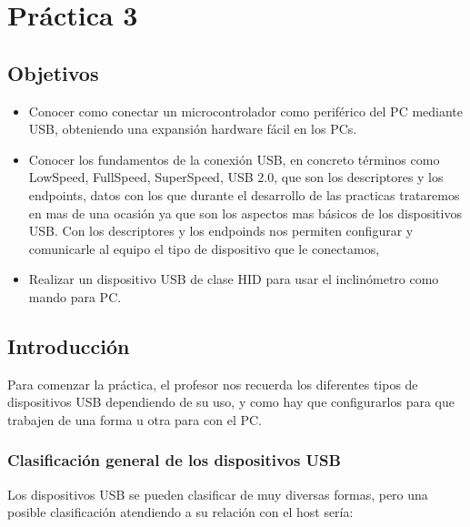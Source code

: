 \documentclass[a4paper, 11pt]{article}
\begin{document}
\section{Práctica 3}

\subsection{Objetivos}

\begin{itemize}
    \item Conocer como conectar un microcontrolador como periférico del PC
        mediante USB, obteniendo una expansión hardware fácil en los PCs.

    \item Conocer los fundamentos de la conexión USB, en concreto términos como
        LowSpeed, FullSpeed, SuperSpeed, USB 2.0, que son los descriptores y
        los endpoints, datos con los que durante el desarrollo de las practicas
        trataremos en mas de una ocasión ya que son los aspectos mas básicos de
        los dispositivos USB.  Con los descriptores y los endpoinds nos
        permiten configurar y comunicarle al equipo el tipo de dispositivo que
        le conectamos,

    \item Realizar un dispositivo USB de clase HID para usar el inclinómetro
        como mando para PC.
\end{itemize}

\subsection{Introducción}

Para comenzar la práctica, el profesor nos recuerda los
diferentes tipos de dispositivos USB dependiendo de su uso, y
como hay que configurarlos para que trabajen de una forma u otra
para con el PC.

\subsubsection{Clasificación general de los dispositivos USB}

Los dispositivos USB se pueden clasificar de muy diversas formas, pero una
posible clasificación atendiendo a su relación con el host sería:
\end{document}
